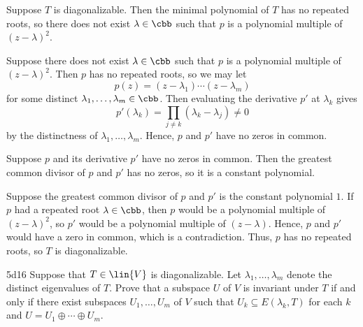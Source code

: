 \begin{sol}
    \leavevmode
    
    {} Suppose $T$ is diagonalizable.
    Then the minimal polynomial of $T$ has no repeated roots, so there does not exist $\lambda \in \cbb$ such that $p$ is a polynomial multiple of $(z - \lambda)^2$.

    {} Suppose there does not exist $\lambda \in \cbb$ such that $p$ is a polynomial multiple of $(z - \lambda)^2$.
    Then $p$ has no repeated roots, so we may let 
    \[
        p(z) = (z - \lambda_1) \cdots (z - \lambda_m)
    \]
    for some distinct $\lambda_1, \ldots, \lambda_m \in \cbb$.
    Then evaluating the derivative $p'$ at $\lambda_k$ gives
    \[
        p'(\lambda_k) = \prod_{j \neq k} (\lambda_k - \lambda_j) \neq 0
    \]
    by the distinctness of $\lambda_1, \ldots, \lambda_m$.
    Hence, $p$ and $p'$ have no zeros in common.

    {} Suppose $p$ and its derivative $p'$ have no zeros in common.
    Then the greatest common divisor of $p$ and $p'$ has no zeros, so it is a constant polynomial.

    {} Suppose the greatest common divisor of $p$ and $p'$ is the constant polynomial $1$.
    If $p$ had a repeated root $\lambda \in \cbb$, then $p$ would be a polynomial multiple of $(z - \lambda)^2$, so $p'$ would be a polynomial multiple of $(z - \lambda)$.
    Hence, $p$ and $p'$ would have a zero in common, which is a contradiction.
    Thus, $p$ has no repeated roots, so $T$ is diagonalizable.
\end{sol}

\begin{exercise}{5d16}
    Suppose that $T \in \lin{V}$ is diagonalizable.
    Let $\lambda_1, \ldots, \lambda_m$ denote the distinct eigenvalues of $T$.
    Prove that a subspace $U$ of $V$ is invariant under $T$ if and only if there exist subspaces $U_1, \ldots, U_m$ of $V$ such that $U_k \subseteq E(\lambda_k, T)$ for each $k$ and $U = U_1 \oplus \cdots \oplus U_m$.
\end{exercise}

